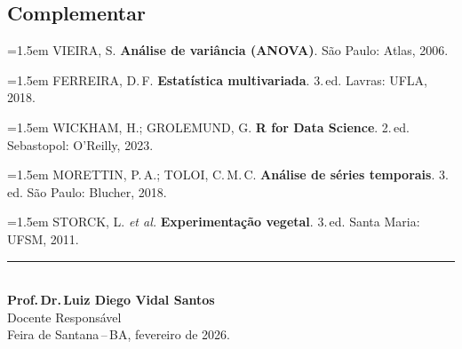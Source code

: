 \documentclass[11pt,a4paper]{article}
\begin{document}
\subsection*{Complementar}

\begin{small}
\hangindent=1.5em
VIEIRA, S. \textbf{Análise de variância (ANOVA)}. São Paulo: Atlas, 2006.\par\medskip

\hangindent=1.5em
FERREIRA, D.\,F. \textbf{Estatística multivariada}. 3.\,ed. Lavras: UFLA, 2018.\par\medskip

\hangindent=1.5em
WICKHAM, H.; GROLEMUND, G. \textbf{R for Data Science}. 2.\,ed. Sebastopol: O'Reilly, 2023.\par\medskip

\hangindent=1.5em
MORETTIN, P.\,A.; TOLOI, C.\,M.\,C. \textbf{Análise de séries temporais}. 3.\,ed. São Paulo: Blucher, 2018.\par\medskip

\hangindent=1.5em
STORCK, L. \textit{et al.} \textbf{Experimentação vegetal}. 3.\,ed. Santa Maria: UFSM, 2011.\par\medskip
\end{small}



\vfill

\begin{center}
\noindent\rule{6cm}{0.4pt}\\[6pt]
\textbf{Prof.\,Dr.\,Luiz Diego Vidal Santos}\\
Docente Responsável\\[4pt]
{\small Feira de Santana\,--\,BA, fevereiro de 2026.}
\end{center}
\end{document}
